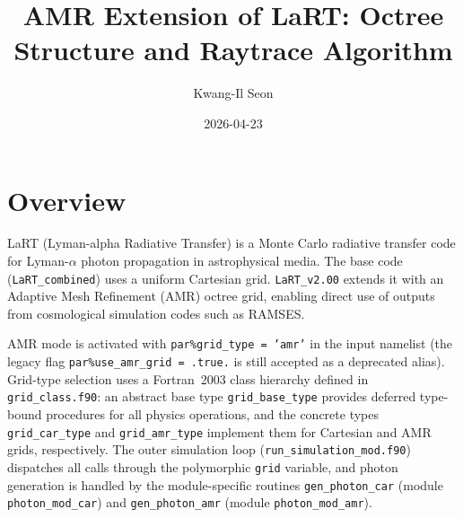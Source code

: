 \documentclass[english,a4paper]{my_memo}
\begin{document}
\title{AMR Extension of LaRT: Octree Structure and Raytrace Algorithm}
\author{Kwang-Il Seon}
\date{2026-04-23}
\maketitle

\tableofcontents
\bigskip

\section{Overview}

LaRT (Lyman-alpha Radiative Transfer) is a Monte Carlo radiative transfer code
for Lyman-$\alpha$ photon propagation in astrophysical media.
The base code (\texttt{LaRT\_combined}) uses a uniform Cartesian grid.
\texttt{LaRT\_v2.00} extends it with an Adaptive Mesh Refinement (AMR) octree
grid, enabling direct use of outputs from cosmological simulation codes such as
RAMSES.

\begin{sloppypar}
AMR mode is activated with \texttt{par\%grid\_type = 'amr'} in the input
namelist (the legacy flag \texttt{par\%use\_amr\_grid = .true.} is still
accepted as a deprecated alias).  Grid-type selection uses a Fortran~2003
class hierarchy defined in \texttt{grid\_class.f90}: an abstract base type
\texttt{grid\_base\_type} provides deferred type-bound procedures for all
physics operations, and the concrete types \texttt{grid\_car\_type} and
\texttt{grid\_amr\_type} implement them for Cartesian and AMR grids,
respectively.  The outer simulation loop (\texttt{run\_simulation\_mod.f90})
dispatches all calls through the polymorphic \texttt{grid} variable, and
photon generation is handled by the module-specific routines
\texttt{gen\_photon\_car} (module \texttt{photon\_mod\_car}) and
\texttt{gen\_photon\_amr} (module \texttt{photon\_mod\_amr}).
\end{sloppypar}
\end{document}
